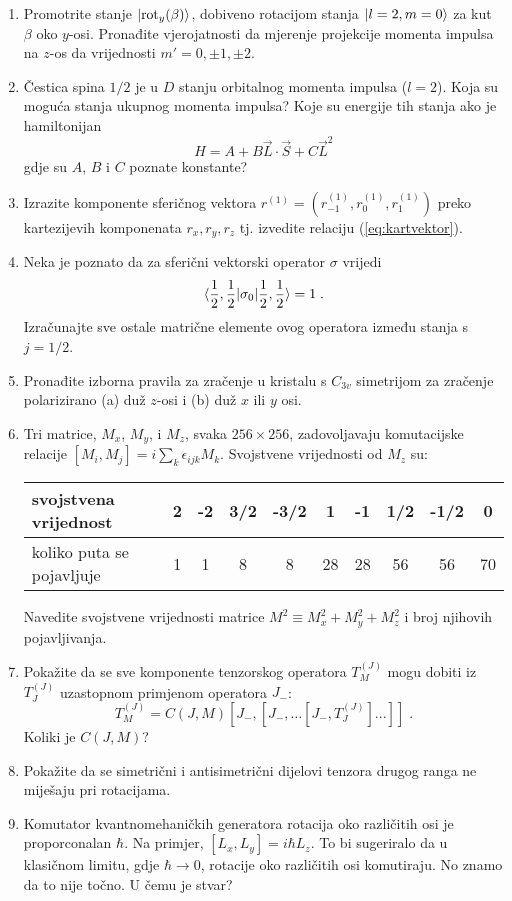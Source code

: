 \begin{enumerate}[label=\arabic{chapter}.\arabic*.]
\item
Promotrite stanje $| \text{rot}_y(\beta) \rangle$, dobiveno rotacijom stanja
$| l=2, m=0 \rangle$ za kut $\beta$ oko $y$-osi. Pronađite vjerojatnosti da
mjerenje projekcije momenta impulsa na $z$-os da vrijednosti
$m'=0,\pm 1, \pm 2$.

\item Čestica spina $1/2$ je u $D$ stanju orbitalnog momenta impulsa
($l=2$). Koja su moguća stanja ukupnog momenta impulsa? Koje su energije
tih stanja ako je hamiltonijan 
\[ H = A + B \vec{L}\cdot\vec{S} + C \vec{L}^2 \]
gdje su $A$, $B$ i $C$ poznate konstante?

\item
Izrazite komponente sferičnog vektora $r^{(1)} = (r^{(1)}_{-1}, r^{(1)}_{0},
r^{(1)}_{1})$ preko kartezijevih komponenata $r_x, r_y, r_z$ tj. izvedite
relaciju (\ref{eq:kartvektor}).

\item Neka je poznato da za sferični vektorski operator $\sigma$ vrijedi
\[  \langle \frac{1}{2}, \frac{1}{2} | \sigma_0 | \frac{1}{2}, \frac{1}{2} \rangle = 1 \;. \]
Izračunajte sve ostale matrične elemente ovog operatora između stanja
s $j = 1/2$.

\item Pronađite izborna pravila za zračenje u kristalu s $C_{3v}$
simetrijom za zračenje polarizirano (a) duž $z$-osi i (b) duž
$x$ ili $y$ osi. 

\item 
Tri matrice, $M_x$, $M_y$, i $M_z$, svaka $256\times 256$, zadovoljavaju
komutacijske relacije $[M_i, M_j] = i \sum_{k} \epsilon_{ijk} M_k$.
Svojstvene vrijednosti od $M_z$ su:
\begin{center}
\begin{tabular}[h]{l|ccccccccc}
\hline
svojstvena vrijednost & 2 & -2 & 3/2 & -3/2 & 1 & -1 & 1/2 & -1/2 & 0 \\ \hline
koliko puta se pojavljuje & 1 & 1 & 8 & 8 & 28 & 28 & 56 & 56 & 70 \\ \hline
\end{tabular}
\end{center}
Navedite svojstvene vrijednosti matrice $M^2 \equiv M_{x}^2 + M_{y}^2 + M_{z}^2$
i broj njihovih pojavljivanja.

\item Pokažite da se sve komponente tenzorskog operatora 
$T^{(J)}_M$ mogu dobiti iz $T^{(J)}_J$ uzastopnom primjenom operatora $J_-$:
\[ T^{(J)}_M = C(J,M) [J_-, [J_-, \dots [J_-, T^{(J)}_J]. . .]] \;. \]
Koliki je $C(J,M)$?

\item \label{zad:antisim} Pokažite da se simetrični i antisimetrični
dijelovi tenzora drugog ranga ne miješaju pri rotacijama.

\item Komutator kvantnomehaničkih generatora rotacija oko različitih osi
    je proporconalan $\hbar$. Na primjer, $[L_x, L_y] = i\hbar L_z$. To
    bi sugeriralo da u klasičnom limitu, gdje $\hbar\to 0$, rotacije
    oko različitih osi komutiraju. No znamo da to nije točno.
    U čemu je stvar?

\end{enumerate}

